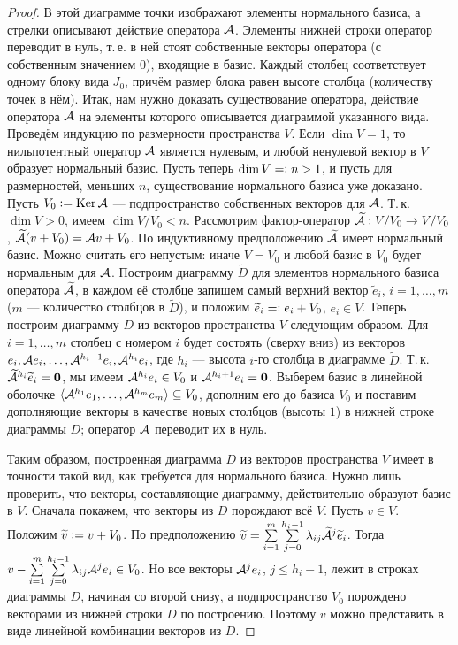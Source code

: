 \begin{proof}
    В этой диаграмме точки изображают элементы нормального базиса, а стрелки описывают действие оператора $\mathcal{A}$. Элементы нижней строки оператор переводит в нуль, т.\,е. в ней стоят собственные векторы оператора (с собственным значением $0$), входящие в базис. Каждый столбец соответствует одному блоку вида $J_0$, причём размер блока равен высоте столбца (количеству точек в нём). Итак, нам нужно доказать существование оператора, действие оператора $\mathcal{A}$ на элементы которого описывается диаграммой указанного вида. Проведём индукцию по размерности пространства $V$. Если $\dim V = 1$, то нильпотентный оператор $\mathcal{A}$ является нулевым, и любой ненулевой вектор в $V$ образует нормальный базис. Пусть теперь $\dim V = \vcentcolon n > 1$, и пусть для размерностей, меньших $n$, существование нормального базиса уже доказано. Пусть $V_0 \vcentcolon= \operatorname{Ker}\mathcal{A}$ --- подпространство собственных векторов для $\mathcal{A}$. Т.\,к. $\dim V > 0$, имеем $\dim V / V_0 < n$. Рассмотрим фактор-оператор $\widetilde{\mathcal{A}}: V / V_0 \to V / V_0$, $\widetilde{\mathcal{A}}(v + V_0) = \mathcal{A} v + V_0$. По индуктивному предположению $\widetilde{\mathcal{A}}$ имеет нормальный базис. Можно считать его непустым: иначе $V = V_0$ и любой базис в $V_0$ будет нормальным для $\mathcal{A}$. Построим диаграмму $\widetilde{D}$ для элементов нормального базиса оператора $\widetilde{\mathcal{A}}$, в каждом её столбце запишем самый верхний вектор $\widetilde{e}_i$, $i = 1, \ldots, m$ ($m$ --- количество столбцов в $\widetilde{D}$), и положим $\widetilde{e}_i = \vcentcolon e_i + V_0$, $e_i \in V$. Теперь построим диаграмму $D$ из векторов пространства $V$ следующим образом. Для $i = 1, \ldots, m$ столбец с номером $i$ будет состоять (сверху вниз) из векторов $e_i, \mathcal{A} e_i, \ldots, \mathcal{A}^{h_i - 1}e_i, \mathcal{A}^{h_i}e_i$, где $h_i$ --- высота $i$-го столбца в диаграмме $\widetilde{D}$. Т.\,к. $\widetilde{\mathcal{A}}^{h_i}\widetilde{e}_i = \boldsymbol{0}$, мы имеем $\mathcal{A}^{h_i}e_i \in V_0$ и $\mathcal{A}^{h_i + 1}e_i = \boldsymbol{0}$. Выберем базис в линейной оболочке $\langle \mathcal{A}^{h_1}e_1, \ldots, \mathcal{A}^{h_m}e_m \rangle \subseteq V_0$, дополним его до базиса $V_0$ и поставим дополняющие векторы в качестве новых столбцов (высоты $1$) в нижней строке диаграммы $D$; оператор $\mathcal{A}$ переводит их в нуль.

    Таким образом, построенная диаграмма $D$ из векторов пространства $V$ имеет в точности такой вид, как требуется для нормального базиса. Нужно лишь проверить, что векторы, составляющие диаграмму, действительно образуют базис в $V$. Сначала покажем, что векторы из $D$ порождают всё $V$. Пусть $v \in V$. Положим $\widetilde{v} \vcentcolon = v + V_0$. По предположению $\widetilde{v} = \sum\limits_{i = 1}^m\sum\limits_{j = 0}^{h_i - 1}\lambda_{ij}\widetilde{\mathcal{A}}^j\widetilde{e}_i$. Тогда $v - \sum\limits_{i = 1}^m\sum\limits_{j = 0}^{h_i - 1}\lambda_{ij}\mathcal{A}^je_i \in V_0$. Но все векторы $\mathcal{A}^je_i$, $j \leqslant h_i - 1$, лежит в строках диаграммы $D$, начиная со второй снизу, а подпространство $V_0$ порождено векторами из нижней строки $D$ по построению. Поэтому $v$ можно представить в виде линейной комбинации векторов из $D$.


\end{proof}
